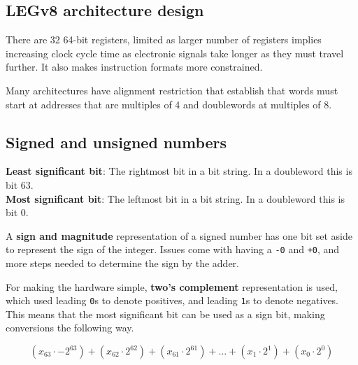 \documentclass[11pt]{article}
\begin{document}
\subsection*{LEGv8 architecture design}

There are 32 64-bit registers, limited as larger number of registers implies increasing clock cycle time as electronic signals take longer as they must travel further. It also makes instruction formats more constrained.

Many architectures have alignment restriction that establish that words must start at addresses that are multiples of 4 and doublewords at multiples of 8.

\pagebreak

\subsection*{Signed and unsigned numbers}

\begin{tcolorbox}[
    enhanced,
    attach boxed title to top left={xshift=6mm,yshift=-1.5mm},
    colback=moonstoneblue!20,
    colframe=moonstoneblue,
    colbacktitle=moonstoneblue,
    title=Denomination of bits in a bit string,
    fonttitle=\bfseries\color{white},
    boxed title style={size=small,colframe=moonstoneblue,sharp corners},
    sharp corners,
    label=box:logic-types,
]
    {\color{moondark}\textbf{Least significant bit}}: The rightmost bit in a bit string. In a doubleword this is bit 63. \\
    {\color{moondark}\textbf{Most significant bit}}: The leftmost bit in a bit string. In a doubleword this is bit 0.
\end{tcolorbox}

A \textbf{sign and magnitude} representation of a signed number has one bit set aside to represent the sign of the integer. Issues come with having a \texttt{-0} and \texttt{+0}, and more steps needed to determine the sign by the adder.

For making the hardware simple, \textbf{two's complement} representation is used, which used leading \texttt{0}s to denote positives, and leading \texttt{1}s to denote negatives. This means that the most significant bit can be used as a sign bit, making conversions the following way.

\vspace{-1em}
$$(x_{63} \cdot -2^{63})+(x_{62} \cdot 2^{62})+(x_{61} \cdot 2^{61})+...+(x_{1} \cdot 2^{1})+(x_{0} \cdot 2^{0})$$
\end{document}
